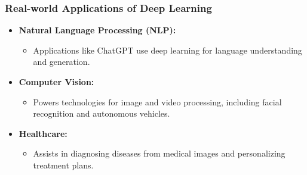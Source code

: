 \documentclass[aspectratio=169]{beamer}
\begin{document}
\begin{frame}[fragile]
    \frametitle{Real-world Applications of Deep Learning}
    \begin{itemize}
        \item \textbf{Natural Language Processing (NLP):} 
            \begin{itemize}
                \item Applications like ChatGPT use deep learning for language understanding and generation.
            \end{itemize}
        
        \item \textbf{Computer Vision:}
            \begin{itemize}
                \item Powers technologies for image and video processing, including facial recognition and autonomous vehicles.
            \end{itemize}

        \item \textbf{Healthcare:}
            \begin{itemize}
                \item Assists in diagnosing diseases from medical images and personalizing treatment plans.
            \end{itemize}
    \end{itemize}
\end{frame}
\end{document}
